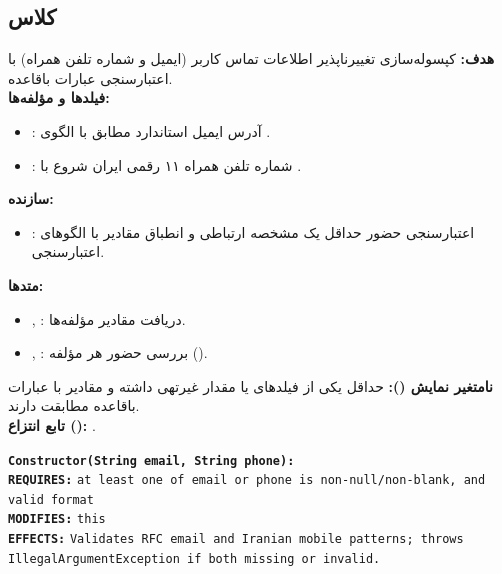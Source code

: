 \documentclass[11pt,a4paper]{article}
\begin{document}
\subsection{کلاس  }
\textbf{هدف:} کپسوله‌سازی تغییرناپذیر اطلاعات تماس کاربر (ایمیل و شماره تلفن همراه) با اعتبارسنجی عبارات باقاعده.\\
\textbf{فیلدها و مؤلفه‌ها:}
\begin{itemize}
    \item {}: آدرس ایمیل استاندارد مطابق با الگوی .
    \item {}: شماره تلفن همراه ۱۱ رقمی ایران شروع با .
\end{itemize}
\textbf{سازنده:}
\begin{itemize}
    \item {}: اعتبارسنجی حضور حداقل یک مشخصه ارتباطی و انطباق مقادیر با الگوهای اعتبارسنجی.
\end{itemize}
\textbf{متدها:}
\begin{itemize}
    \item {}, : دریافت مقادیر مؤلفه‌ها.
    \item {}, : بررسی حضور هر مؤلفه ().
\end{itemize}
\textbf{نامتغیر نمایش ():} حداقل یکی از فیلدهای  یا  مقدار غیرتهی داشته و مقادیر با عبارات باقاعده مطابقت دارند.\\
\textbf{تابع انتزاع ():} .
\begin{contractbox}
\begin{latin}
\setlength{\parindent}{0pt}
\setlength{\parskip}{2pt}
\small
\textbf{\color{autnavy}\texttt{Constructor(String email, String phone):}} \\
\hspace*{1.5em}\textbf{\color{darkred}\texttt{REQUIRES:}} \texttt{at least one of email or phone is non-null/non-blank, and valid format} \\
\hspace*{1.5em}\textbf{\color{autblue}\texttt{MODIFIES:}} \texttt{this} \\
\hspace*{1.5em}\textbf{\color{autteal}\texttt{EFFECTS:}}  \texttt{Validates RFC email and Iranian mobile patterns; throws IllegalArgumentException if both missing or invalid.}
\end{latin}
\end{contractbox}
\end{document}
